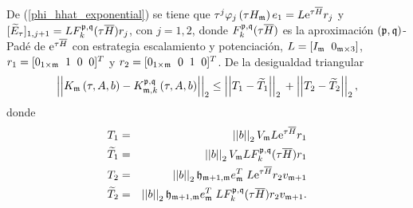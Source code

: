 De (\ref{phi_hhat_exponential}) se tiene que
$\tau^j \varphi_j\left( \tau H_{\mathfrak{m}} \right) e_1 = L \mathrm{e}^{\tau \overline{H}} r_j$
y
$[\widetilde{E}_{\tau}]_{1,j+1} = L F_k^{\mathfrak{p},\mathfrak{q}}(\tau \overline{H}) r_j$,
con $j=1,2$, donde $F_k^{\mathfrak{p},\mathfrak{q}}(\tau \overline{H})$ es la aproximación $(\mathfrak{p},\mathfrak{q})$-Padé de $\mathrm{e}^{\tau \overline{H}}$ con estrategia escalamiento y potenciación,
$ L=[I_{\mathfrak{m}} \;\; 0_{\mathfrak{m}\times 3}] $, $r_1=[0_{1\times \mathfrak{m}}\;\; 1 \;\;0 \;\;0]^T$ y $r_2=[0_{1\times \mathfrak{m}}\;\; 0 \;\;1 \;\;0]^{T}$. De la desigualdad triangular
\begin{equation}\label{proffktheouneq}
\left\lvert\left\lvert   K_{\mathfrak{m}}\left( \tau , A , b \right) -
K_{\mathfrak{m},k}^{\mathfrak{p},\mathfrak{q}}\left( \tau, A , b \right)\right\rvert\right\rvert_2
\leq \left\lvert\left\lvert T_1 -
\widetilde{T}_1\right\rvert\right\rvert_2 \\
+\left\lvert\left\lvert T_2 - \widetilde{T}_2
\right\rvert\right\rvert_2,
\end{equation}
donde
\begin{eqnarray*}
	T_1&=&\left\lvert \left\lvert b \right\rvert \right\rvert_2 V_{\mathfrak{m}} L \mathrm{e}^{\tau \overline{H}} r_1\\
	\widetilde{T}_1&=&\left\lvert \left\lvert b \right\rvert \right\rvert_2 V_{\mathfrak{m}} L F_k^{\mathfrak{p},\mathfrak{q}}(\tau \overline{H}) r_1\\
	T_2&=&\left\lvert \left\lvert b \right\rvert \right\rvert_2 \mathfrak{h}_{\mathfrak{m}+1,\mathfrak{m}}e_{\mathfrak{m}}^T\;L \mathrm{e}^{\tau \overline{H}} r_2 v_{\mathfrak{m}+1}\\
	\widetilde{T}_2&=&\left\lvert \left\lvert b \right\rvert \right\rvert_2 \mathfrak{h}_{\mathfrak{m}+1,\mathfrak{m}}e_{\mathfrak{m}}^T\;L F_k^{\mathfrak{p},\mathfrak{q}}(\tau \overline{H}) r_2 v_{\mathfrak{m}+1}.
\end{eqnarray*}

